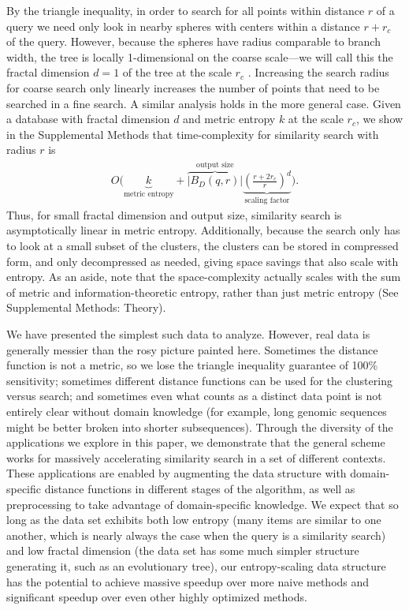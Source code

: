\documentclass[review,preprint,12pt]{elsarticle}
\renewcommand{\cite}{\citep} %
\theoremstyle{definition}
\theoremstyle{remark}
\numberwithin{equation}{section}
\begin{document}
By the triangle inequality, in order to search for all points within distance $r$ of a query we need only look in nearby spheres with centers within a distance $r+r_c$ of the query.
However, because the spheres have radius comparable to branch width, the tree is locally 1-dimensional on the coarse scale---we will call this the fractal dimension $d=1$ of the tree at the scale $r_c$ \cite{falconer1990fractal}.
Increasing the search radius for coarse search only linearly increases the number of points that need to be searched in a fine search.
A similar analysis holds in the more general case.
Given a database with fractal dimension $d$ and metric entropy $k$ at the scale $r_c$, we show in the Supplemental Methods that time-complexity for similarity search with radius $r$ is
\begin{gather}
    O\Bigg(
    \underbrace{k}_{\textrm{metric entropy}} +
    \overbrace{\left|B_D(q,r)\right|}^{\textrm{output size}}
    \underbrace{\left(\frac{r+2r_c}{r}\right)^d}_{\textrm{scaling factor}}
     \Bigg) .
\end{gather}
Thus, for small fractal dimension and output size, similarity search is asymptotically linear in metric entropy.
Additionally, because the search only has to look at a small subset of the clusters, the clusters can be stored in compressed form, and only decompressed as needed, giving space savings that also scale with entropy.
As an aside, note that the space-complexity actually scales with the sum of metric and information-theoretic entropy, rather than just metric entropy (See Supplemental Methods: Theory).

We have presented the simplest such data to analyze.
However, real data is generally messier than the rosy picture painted here.
Sometimes the distance function is not a metric, so we lose the triangle inequality guarantee of 100\% sensitivity;
sometimes different distance functions can be used for the clustering versus search;
and sometimes even what counts as a distinct data point is not entirely clear without domain knowledge (for example, long genomic sequences might be better broken into shorter subsequences).
%
Through the diversity of the applications we explore in this paper, we demonstrate that the general scheme works for massively accelerating similarity search in a set of different contexts.
These applications are enabled by augmenting the data structure with domain-specific distance functions in different stages of the algorithm, as well as preprocessing to take advantage of domain-specific knowledge.
We expect that so long as the data set exhibits both low entropy (many items are similar to one another, which is nearly always the case when the query is a similarity search) and low fractal dimension (the data set has some much simpler structure generating it, such as an evolutionary tree), our entropy-scaling data structure has the potential to achieve massive speedup over more naive methods and significant speedup over even other highly optimized methods.
\end{document}
